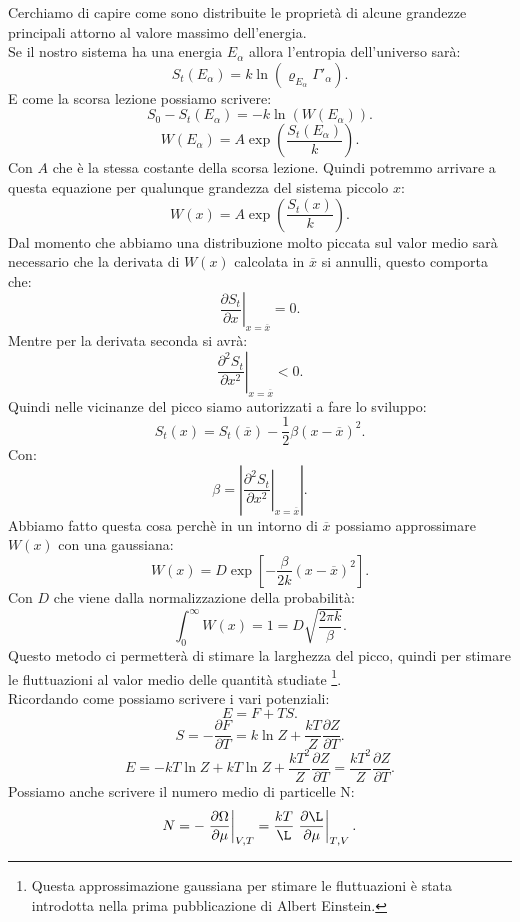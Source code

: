 Cerchiamo di capire come sono distribuite le proprietà di alcune grandezze principali attorno al valore massimo dell'energia. \\
Se il nostro sistema ha una energia $E_{\alpha}$ allora l'entropia dell'universo sarà:
\[
    S_{t}\left( E_{\alpha} \right) = k \ln (\varrho_{E_{\alpha}} \Gamma'_{\alpha})
.\] 
E come la scorsa lezione possiamo scrivere:
\[
	S_0-S_{t}\left( E_{\alpha} \right) = -k \ln\left( W\left( E_{\alpha} \right)  \right) 
.\] 
\[
	W\left( E_{\alpha} \right) = A \exp \left( \frac{S_{t}\left( E_{\alpha} \right) }{k} \right) 
.\] 
Con $A$ che è la stessa costante della scorsa lezione. Quindi potremmo arrivare a questa equazione per qualunque grandezza del sistema piccolo $x$:
\[
	W\left( x \right) = A \exp\left( \frac{S_{t}\left( x \right) }{k} \right) 
.\] 
Dal momento che abbiamo una distribuzione molto piccata sul valor medio sarà necessario che la derivata di $W(x)$ calcolata in $\overline{x}$ si annulli,
questo comporta che:
\[
	\left.\frac{\partial S_{t}}{\partial x} \right|_{x = \overline{x}}=0
.\] 
Mentre per la derivata seconda si avrà:
\[
	\left.\frac{\partial ^2 S_{t}}{\partial x^2 } \right|_{x = \overline{x}} < 0
.\] 
Quindi nelle vicinanze del picco siamo autorizzati a fare lo sviluppo:
\[
	S_{t}\left( x \right) = S_{t}\left( \overline{x} \right) - \frac{1}{2} \beta \left( x - \overline{x} \right) ^2
.\] 
Con:
\[
	\beta = \left|\left.\frac{\partial ^2 S_{t}}{\partial x^2} \right|_{x =\overline{x}}\right|
.\] 
Abbiamo fatto questa cosa perchè in un intorno di $\overline{x}$ possiamo approssimare $W\left( x \right) $ con una gaussiana:
\[
	W\left( x \right) = D \exp \left[ - \frac{\beta}{2k} \left( x - \overline{x} \right) ^2\right] 
.\] \label{eq:Gauss-approx} 
Con $D$ che viene dalla normalizzazione della probabilità:
\[
	\int_{0}^{\infty} W\left( x \right) = 1  = D \sqrt{\frac{2\pi k}{\beta}} 
.\] 
Questo metodo ci permetterà di stimare la larghezza del picco, quindi per stimare le fluttuazioni al valor medio delle quantità studiate \footnote{Questa approssimazione gaussiana per stimare le fluttuazioni è stata introdotta nella prima pubblicazione di Albert Einstein.}.\\
Ricordando come possiamo scrivere i vari potenziali:
\[
	E = F +TS
.\] 
\[
	S = - \frac{\partial F}{\partial T} = k \ln Z + \frac{kT}{Z}\frac{\partial Z}{\partial T} 
.\] 
\[
	E = -kT \ln Z + kT \ln Z + \frac{kT^2}{Z} \frac{\partial Z}{\partial T} = \frac{kT^2}{Z}\frac{\partial Z}{\partial T} 
.\] 
Possiamo anche scrivere il numero medio di particelle N:
\[
	N = - \left.\frac{\partial \Omega}{\partial \mu}\right|_{V,T} = \frac{kT}{\L} \left.\frac{\partial \L}{\partial \mu} \right|_{T,V} 
.\] 
